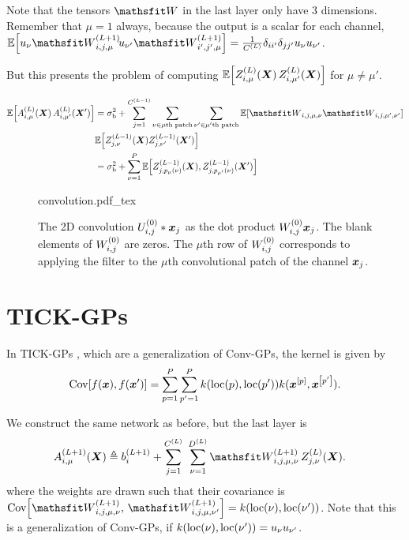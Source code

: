 \documentclass{article} %
\newcommand{\bracket}[3]{{\left#1 #3 \right#2}}
\newcommand{\bra}{\bracket{(}{)}}
\newcommand{\sqb}{\bracket{[}{]}}
\newcommand{\ssup}[1]{^\bra{#1}}
\newcommand{\eqdef}{\triangleq}
\newcommand{\patch}[1]{{{#1}\text{th patch}}}
\begin{document}
Note that the tensors $\etW$ in the last layer only have 3 dimensions. Remember that
$\mu=1$ always, because the output is a scalar for each channel,
$\E\sqb{u_\nu\etW\ssup{L+1}_{i,j,\mu}\! u_{\nu'}\etW\ssup{L+1}_{i',j',\mu}} =
\frac{1}{C\ssup{L}}\delta_{ii'}\delta_{jj'}\evu_\nu \evu_{\nu'}$.

But this presents the problem of computing
$\E\sqb{\emZ\ssup{L}_{i,\mu}(\mX)\, \emZ\ssup{L}_{i,\mu'}(\mX)}$ for $\mu\neq
\mu'$.

\begin{equation}
\begin{aligned}
  \E\sqb{\emA\ssup{L}_{i,\mu}(\mX)\, \emA\ssup{L}_{i,\mu'}(\mX')} &= \sigma_\text{b}^2
  + \sum_{j=1}^{C\ssup{L-1}} \sum_{\nu\in \patch{\mu}}\sum_{\nu'\in \patch{\mu'}} \E\sqb{\etW_{i,j,\mu,\nu} \etW_{i,j,\mu',\nu'}}\\
  &\E\sqb{Z\ssup{L-1}_{j,\nu}(\mX)Z\ssup{L-1}_{j,\nu'}(\mX')} \\
  &= \sigma_\text{b}^2 + \sum_{\nu=1}^P \E\sqb{Z\ssup{L-1}_{j,p_\mu(\nu)}(\mX), Z\ssup{L-1}_{j,p_{\mu'}(\nu)}(\mX')}
\end{aligned}
\end{equation}



\begin{figure}%
  \centerline{{convolution.pdf_tex}}
  \caption{The 2D convolution $\emU\ssup{0}_{i,j} * \vx_j$ as the dot product
    $\emW\ssup{0}_{i,j} \vx_j$. The blank elements of $\emW\ssup{0}_{i,j}$ are zeros.
    The $\mu$th row of $\emW\ssup{0}_{i,j}$ corresponds to applying the filter to the
    $\mu$th convolutional patch of the channel ${\bm{x}}_j$. \label{fig:conv-as-linear}}
\end{figure}

\section{TICK-GPs}
In TICK-GPs \citep{dutordoir2019tick}, which are a generalization of Conv-GPs, the kernel is given by
\begin{equation}
\Cov\sqb{f(\vx), f(\vx')} = \sum_{p=1}^P\sum_{p'=1}^P k\bra{\text{loc}\bra{p}, \text{loc}\bra{p'}} k(\vx^\sqb{p}, \vx^\sqb{p'}).
\end{equation}

We construct the same network as before, but the last layer is
\begin{align}
\emA_{i,\mu}\ssup{L+1}(\mX) &\eqdef \evb_i\ssup{L+1} +
\sum_{j=1}^{C\ssup{L}} \ \sum_{\nu=1}^{D\ssup{L}} \etW\ssup{L+1}_{i,j,\mu,\nu}\, \emZ\ssup{L}_{j,\nu}(\mX).
\label{eq:tickgp-network-final}
\end{align}
where the weights are drawn such that their covariance is
$\Cov\sqb{\etW\ssup{L+1}_{i,j,\mu,\nu},\, \etW\ssup{L+1}_{i,j,\mu,\nu'}} =
k(\text{loc}(\nu), \text{loc}(\nu'))$. Note that this is a generalization of
Conv-GPs, if $k(\text{loc}(\nu), \text{loc}(\nu')) = {u}_\nu {u}_{\nu'}$.
\end{document}
